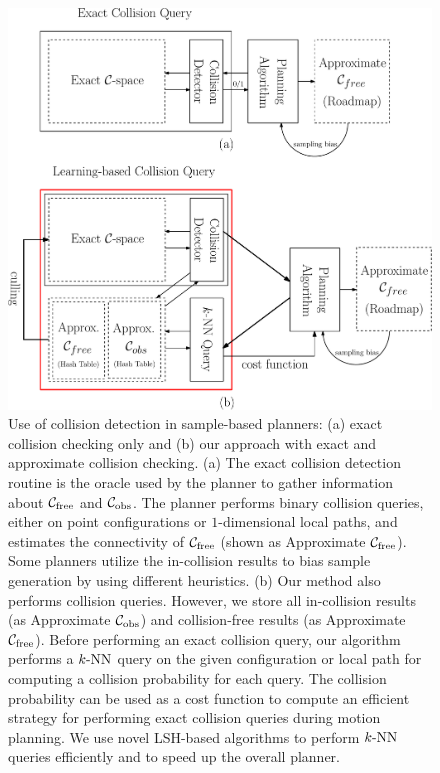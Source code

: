 \begin{figure}[!h]
  \centering
  \includegraphics[width=0.7\linewidth]{figs/3/oracle.pdf}
  \caption[Comparison between prior sample-based planners and planners enhanced by instance-based learning]{Use of collision detection in sample-based planners: (a) exact collision checking only and (b) our approach with exact and approximate collision checking. (a) The exact collision detection routine is the oracle used by the planner to gather information about $\mathcal C_{\text{free}}$ and $\mathcal C_{\text{obs}}$. The planner performs binary collision queries, either on point configurations or $1$-dimensional local paths, and estimates the connectivity of $\mathcal C_{\text{free}}$ (shown as Approximate $\mathcal C_{\text{free}}$). Some planners utilize the in-collision results to bias sample generation by using different heuristics. (b) Our method also performs collision queries. However, we store all in-collision results (as Approximate $\mathcal C_{\text{obs}}$) and collision-free results (as Approximate $\mathcal C_{\text{free}}$). Before performing an exact collision query, our algorithm performs a $k\text{-NN}$ query on the given configuration or local path for computing a collision probability for each query. The collision probability can be used as a cost function to compute an efficient strategy for performing exact collision queries during motion planning. We use novel LSH-based algorithms to perform $k\text{-NN}$ queries efficiently and to speed up the overall planner.}
  \label{fig:3:oracle}
\end{figure}


